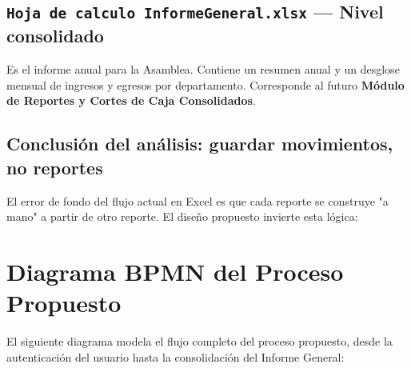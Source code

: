 \documentclass[11pt,a4paper]{article}
\begin{document}
	\subsection{\texttt{Hoja de calculo InformeGeneral.xlsx} — Nivel consolidado}
	Es el informe anual para la Asamblea. Contiene un resumen anual y un desglose mensual de ingresos y egresos por departamento. Corresponde al futuro \textbf{Módulo de Reportes y Cortes de Caja Consolidados}.
	
	\subsection{Conclusión del análisis: guardar movimientos, no reportes}
	El error de fondo del flujo actual en Excel es que cada reporte se construye "a mano" a partir de otro reporte. El diseño propuesto invierte esta lógica:
	
	\begin{center}
	\end{center}
	
	
	\newpage
	\section{Diagrama BPMN del Proceso Propuesto}
	
	El siguiente diagrama modela el flujo completo del proceso propuesto, desde la autenticación del usuario hasta la consolidación del Informe General:
	
\end{document}
